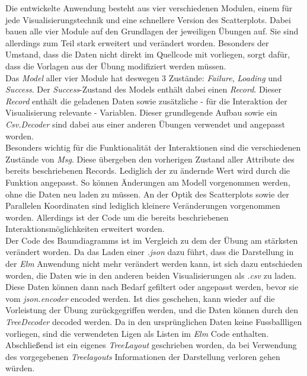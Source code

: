 \documentclass[usegeometry=true]{scrartcl}
\begin{document}
Die entwickelte Anwendung besteht aus vier verschiedenen Modulen, einem für jede Visualisierungstechnik und eine schnellere Version des Scatterplots. Dabei bauen alle vier Module auf den Grundlagen der jeweiligen Übungen auf. Sie sind allerdings zum Teil stark erweitert und verändert worden.
Besonders der Umstand, dass die Daten nicht direkt im Quellcode mit vorliegen, sorgt dafür, dass die Vorlagen aus der Übung modifiziert werden müssen.\\
Das \textit{Model} aller vier Module hat deswegen 3 Zustände: \textit{Failure}, \textit{Loading} und \textit{Success}. Der \textit{Success}-Zustand des Models enthält dabei einen \textit{Record}. Dieser \textit{Record} enthält die geladenen Daten sowie zusätzliche - für die Interaktion der Visualisierung relevante - Variablen. Dieser grundlegende Aufbau sowie ein \textit{Csv.Decoder} sind dabei aus einer anderen Übungen verwendet und angepasst worden.\\
Besonders wichtig für die Funktionalität der Interaktionen sind die verschiedenen Zustände von \textit{Msg}. Diese übergeben den vorherigen Zustand aller Attribute des bereits beschriebenen Records. Lediglich der zu ändernde Wert wird durch die Funktion angepasst. So können Änderungen am Modell vorgenommen werden, ohne die Daten neu laden zu müssen. An der Optik des Scatterplots sowie der Parallelen Koordinaten sind lediglich kleinere Veränderungen vorgenommen worden. Allerdings ist der Code um die bereits beschriebenen Interaktionsmöglichkeiten erweitert worden.\\
Der Code des Baumdiagramms ist im Vergleich zu dem der Übung am stärksten verändert worden. Da das Laden einer \textit{.json} dazu führt, dass die Darstellung in der \textit{Elm} Anwendung nicht mehr verändert werden kann, ist sich dazu entschieden worden, die Daten wie in den anderen beiden Visualisierungen als \textit{.csv} zu laden. Diese Daten können dann nach Bedarf gefiltert oder angepasst werden, bevor sie vom \textit{json.encoder} encoded werden. Ist dies geschehen, kann wieder auf die Vorleistung der Übung zurückgegriffen werden, und die Daten können durch den \textit{TreeDecoder} decoded werden. Da in den ursprünglichen Daten keine Fussballligen vorliegen, sind die verwendeten Ligen als Listen im \textit{Elm} Code enthalten. Abschließend ist ein eigenes \textit{TreeLayout} geschrieben worden, da bei Verwendung des vorgegebenen \textit{Treelayouts} Informationen der Darstellung verloren gehen würden.
\end{document}
